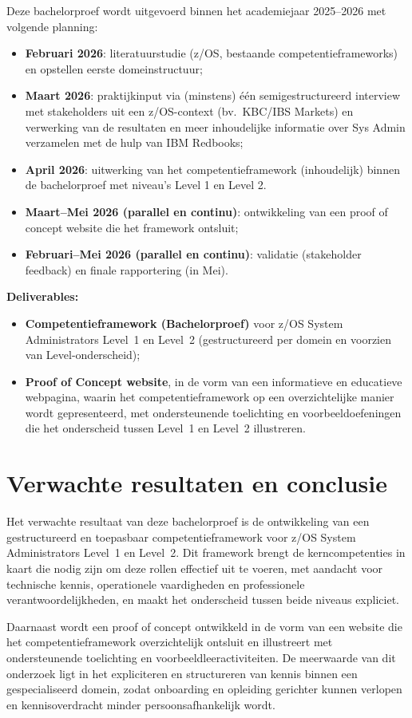 Deze bachelorproef wordt uitgevoerd binnen het academiejaar 2025--2026 met volgende planning:
\begin{itemize}
	\item \textbf{Februari 2026}: literatuurstudie (z/OS, bestaande competentieframeworks) en opstellen eerste domeinstructuur;
	\item \textbf{Maart 2026}: praktijkinput via (minstens) één semigestructureerd interview met stakeholders uit een z/OS-context (bv.\ KBC/IBS Markets) en verwerking van de resultaten en meer inhoudelijke informatie over Sys Admin verzamelen met de hulp van IBM Redbooks;
	\item \textbf{April 2026}: uitwerking van het competentieframework (inhoudelijk) binnen de bachelorproef met niveau's Level 1 en Level 2.
	\item \textbf{Maart--Mei 2026 (parallel en continu)}: ontwikkeling van een proof of concept website die het framework ontsluit;
	\item \textbf{Februari--Mei 2026 (parallel en continu)}: validatie (stakeholder feedback) en finale rapportering (in Mei).
\end{itemize}

\textbf{Deliverables:}
\begin{itemize}
	\item \textbf{Competentieframework (Bachelorproef)} voor z/OS System Administrators Level~1 en Level~2 (gestructureerd per domein en voorzien van Level-onderscheid);
	\item \textbf{Proof of Concept website}, in de vorm van een informatieve en educatieve webpagina, waarin het competentieframework op een overzichtelijke manier wordt gepresenteerd, met ondersteunende toelichting en voorbeeldoefeningen die het onderscheid tussen Level~1 en Level~2 illustreren.
\end{itemize}


\section{Verwachte resultaten en conclusie}%
\label{sec:verwachte_resultaten}

Het verwachte resultaat van deze bachelorproef is de ontwikkeling van een gestructureerd en toepasbaar competentieframework voor z/OS System Administrators Level~1 en Level~2. Dit framework brengt de kerncompetenties in kaart die nodig zijn om deze rollen effectief uit te voeren, met aandacht voor technische kennis, operationele vaardigheden en professionele verantwoordelijkheden, en maakt het onderscheid tussen beide niveaus expliciet.

Daarnaast wordt een proof of concept ontwikkeld in de vorm van een website die het competentieframework overzichtelijk ontsluit en illustreert met ondersteunende toelichting en voorbeeldleeractiviteiten. De meerwaarde van dit onderzoek ligt in het expliciteren en structureren van kennis binnen een gespecialiseerd domein, zodat onboarding en opleiding gerichter kunnen verlopen en kennisoverdracht minder persoonsafhankelijk wordt. 
